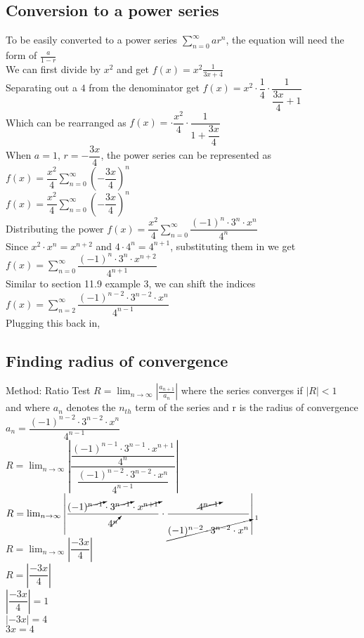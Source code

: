\documentclass{article}
\begin{document}
\subsection*{Conversion to a power series}
To be easily converted to a power series $ \sum_{n=0}^{\infty}ar^n$, the equation will need the form of $ \frac{a}{1-r}$
\\[0.1in] We can first divide by $ x^2$ and get $ f(x) = x^2 \frac{1}{3x+4}$
\\[0.1in] Separating out a $ 4$ from the denominator get $ f(x) = x^2 \cdot \dfrac{1}{4} \cdot \dfrac{1}{\dfrac{3x}{4}+1}$ 
\\ Which can be rearranged as $ f(x) =  \cdot \dfrac{x^2}{4} \cdot \dfrac{1}{1+ \dfrac{3x}{4}}$
\\[0.05in] When $a=1$, $r =  - \dfrac{3x}{4}$, the power series can be represented as $ f(x) = \dfrac{x^2}{4}  \sum_{n=0}^{\infty}\left(-\dfrac{3x}{4}\right)^n$
\\[0.05in] $ f(x) = \dfrac{x^2}{4}  \sum_{n=0}^{\infty}\left(-\dfrac{3x}{4}\right)^n$
\\[0.05in] Distributing the power $ f(x) = \dfrac{x^2}{4}  \sum_{n=0}^{\infty}\dfrac{(-1)^n\cdot3^n\cdot x^n}{4^n}$
\\[0.05in] Since $x^2\cdot x^n = x^{n+2}$ and $4 \cdot 4^n = 4^{n+1}$, substituting them in we get $ f(x) =   \sum_{n=0}^{\infty}\dfrac{(-1)^n\cdot3^n\cdot x^{n+2}}{4^{n+1}}$
\\[0.05in] Similar to section 11.9 example 3, we can shift the indices $ f(x) =   \sum_{n=2}^{\infty}\dfrac{(-1)^{n-2}\cdot3^{n-2}\cdot x^{n}}{4^{n-1}}$
\\[0.05in] Plugging this back in, 
\subsection*{Finding radius of convergence}
Method: Ratio Test $R =  \lim_{n\to\infty}\left| \frac{a_{n+1}}{a_n} \right|$ where the series converges if $|R|<1$
\\[0.1in]and where $a_n$ denotes the $n_{th}$ term of the series and r is the radius of convergence
\\[0.1in] $a_n= \dfrac{(-1)^{n-2}\cdot3^{n-2}\cdot x^{n}}{4^{n-1}}$
\\[0.1in] $R=\lim_{n\to\infty} \left|   \dfrac{\dfrac{(-1)^{n-1}\cdot3^{n-1}\cdot x^{n+1}}{4^{n}}}{\dfrac{(-1)^{n-2}\cdot3^{n-2}\cdot x^{n}}{4^{n-1}}}    \right|$
\\[0.1in] $R=\lim_{n\to\infty} \left|   \dfrac{(-1)^{\cancelto{}{n-1}}\cdot3^{\cancelto{}{n-1}}\cdot x^{\cancelto{}{n+1}}}{4^{\cancelto{}{n}}}\cdot \dfrac{\cancelto{}{4^{n-1}}}{\cancelto{1}{(-1)^{n-2}\cdot3^{n-2}\cdot x^{n}}}    \right|$
\\[0.1in] $R=\lim_{n\to\infty} \left|   \dfrac{-3x}{4} \right|$
\\[0.1in] $R=\left|   \dfrac{-3x}{4} \right|$
\\[0.1in] $\left|   \dfrac{-3x}{4} \right| = 1$
\\[0.1in] $\left|   -3x \right| = 4$
\\[0.1in] $3x = 4$
\\[0.1in] 
\end{document}
